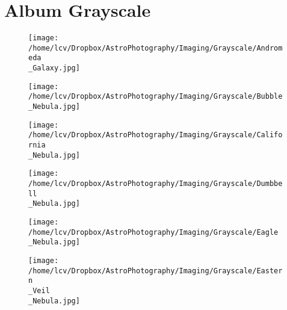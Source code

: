 \section{Album Grayscale}
\begin{figure}[phbt]
	\texttt{[image: /home/lcv/Dropbox/AstroPhotography/Imaging/Grayscale/Andromeda\\\_Galaxy.jpg]}


\end{figure}
\newpage
\begin{figure}[phbt]
	\texttt{[image: /home/lcv/Dropbox/AstroPhotography/Imaging/Grayscale/Bubble\\\_Nebula.jpg]}


\end{figure}
\newpage
\begin{figure}[phbt]
	\texttt{[image: /home/lcv/Dropbox/AstroPhotography/Imaging/Grayscale/California\\\_Nebula.jpg]}


\end{figure}
\newpage
\begin{figure}[phbt]
	\texttt{[image: /home/lcv/Dropbox/AstroPhotography/Imaging/Grayscale/Dumbbell\\\_Nebula.jpg]}


\end{figure}
\newpage
\begin{figure}[phbt]
	\texttt{[image: /home/lcv/Dropbox/AstroPhotography/Imaging/Grayscale/Eagle\\\_Nebula.jpg]}


\end{figure}
\newpage
\begin{figure}[phbt]
	\texttt{[image: /home/lcv/Dropbox/AstroPhotography/Imaging/Grayscale/Eastern\\\_Veil\\\_Nebula.jpg]}


\end{figure}
